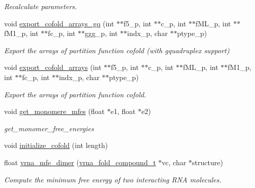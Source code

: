 \begin{DoxyCompactItemize}
\begin{DoxyCompactList}\small\item\em Recalculate parameters. \end{DoxyCompactList}\item 
void \hyperlink{group__mfe__cofold_ga5f5bf4df35d0554f6ace9579f8744c48}{export\-\_\-cofold\-\_\-arrays\-\_\-gq} (int $\ast$$\ast$f5\-\_\-p, int $\ast$$\ast$c\-\_\-p, int $\ast$$\ast$f\-M\-L\-\_\-p, int $\ast$$\ast$f\-M1\-\_\-p, int $\ast$$\ast$fc\-\_\-p, int $\ast$$\ast$ggg\-\_\-p, int $\ast$$\ast$indx\-\_\-p, char $\ast$$\ast$ptype\-\_\-p)
\begin{DoxyCompactList}\small\item\em Export the arrays of partition function cofold (with gquadruplex support) \end{DoxyCompactList}\item 
void \hyperlink{group__mfe__cofold_ga5cb6b59983f1f74ccc00b9b9c4e84482}{export\-\_\-cofold\-\_\-arrays} (int $\ast$$\ast$f5\-\_\-p, int $\ast$$\ast$c\-\_\-p, int $\ast$$\ast$f\-M\-L\-\_\-p, int $\ast$$\ast$f\-M1\-\_\-p, int $\ast$$\ast$fc\-\_\-p, int $\ast$$\ast$indx\-\_\-p, char $\ast$$\ast$ptype\-\_\-p)
\begin{DoxyCompactList}\small\item\em Export the arrays of partition function cofold. \end{DoxyCompactList}\item 
void \hyperlink{group__mfe__cofold_ga4958b517c613e4d2afd5bce6c1060a79}{get\-\_\-monomere\-\_\-mfes} (float $\ast$e1, float $\ast$e2)
\begin{DoxyCompactList}\small\item\em get\-\_\-monomer\-\_\-free\-\_\-energies \end{DoxyCompactList}\item 
void \hyperlink{group__mfe__cofold_gafee0c32208aa2ac97338b6e3fbad7fa5}{initialize\-\_\-cofold} (int length)
\item 
float \hyperlink{group__mfe__cofold_gaab22d10c1190f205f16a77cab9d5d3ee}{vrna\-\_\-mfe\-\_\-dimer} (\hyperlink{group__fold__compound_ga1b0cef17fd40466cef5968eaeeff6166}{vrna\-\_\-fold\-\_\-compound\-\_\-t} $\ast$vc, char $\ast$structure)
\begin{DoxyCompactList}\small\item\em Compute the minimum free energy of two interacting R\-N\-A molecules. \end{DoxyCompactList}\end{DoxyCompactItemize}


